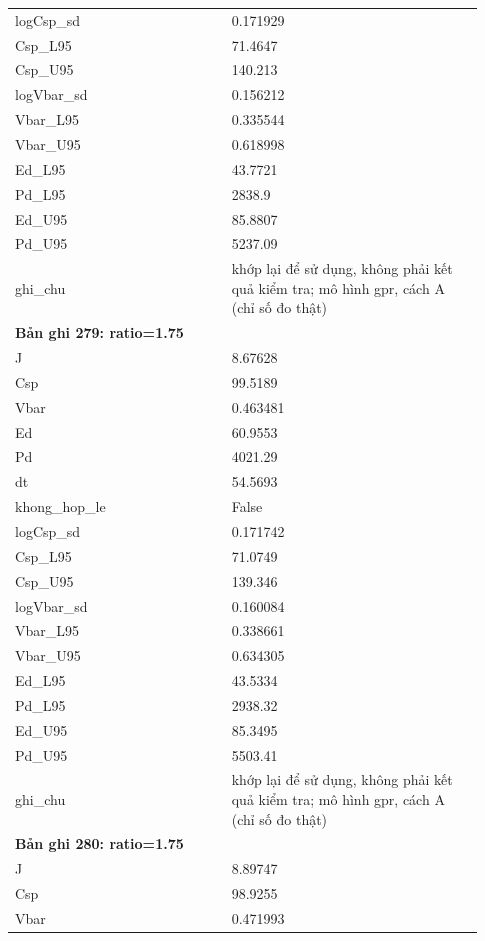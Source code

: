 \begin{longtable}{p{0.43\linewidth}p{0.50\linewidth}}
logCsp\_\allowbreak sd & 0.171929 \\
Csp\_\allowbreak L95 & 71.4647 \\
Csp\_\allowbreak U95 & 140.213 \\
logVbar\_\allowbreak sd & 0.156212 \\
Vbar\_\allowbreak L95 & 0.335544 \\
Vbar\_\allowbreak U95 & 0.618998 \\
Ed\_\allowbreak L95 & 43.7721 \\
Pd\_\allowbreak L95 & 2838.9 \\
Ed\_\allowbreak U95 & 85.8807 \\
Pd\_\allowbreak U95 & 5237.09 \\
ghi\_\allowbreak chu & khớp lại để sử dụng, không phải kết quả kiểm tra; mô hình gpr, cách A (chỉ số đo thật) \\
\midrule
\multicolumn{2}{p{0.95\linewidth}}{\textbf{Bản ghi 279: ratio=1.75}} \\
J & 8.67628 \\
Csp & 99.5189 \\
Vbar & 0.463481 \\
Ed & 60.9553 \\
Pd & 4021.29 \\
dt & 54.5693 \\
khong\_\allowbreak hop\_\allowbreak le & False \\
logCsp\_\allowbreak sd & 0.171742 \\
Csp\_\allowbreak L95 & 71.0749 \\
Csp\_\allowbreak U95 & 139.346 \\
logVbar\_\allowbreak sd & 0.160084 \\
Vbar\_\allowbreak L95 & 0.338661 \\
Vbar\_\allowbreak U95 & 0.634305 \\
Ed\_\allowbreak L95 & 43.5334 \\
Pd\_\allowbreak L95 & 2938.32 \\
Ed\_\allowbreak U95 & 85.3495 \\
Pd\_\allowbreak U95 & 5503.41 \\
ghi\_\allowbreak chu & khớp lại để sử dụng, không phải kết quả kiểm tra; mô hình gpr, cách A (chỉ số đo thật) \\
\midrule
\multicolumn{2}{p{0.95\linewidth}}{\textbf{Bản ghi 280: ratio=1.75}} \\
J & 8.89747 \\
Csp & 98.9255 \\
Vbar & 0.471993 \\

\end{longtable}

